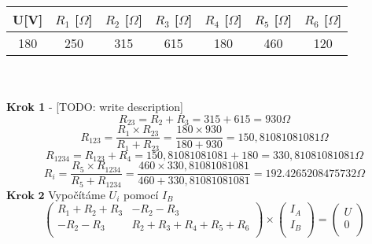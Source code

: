 \documentclass{article}
\begin{document}
\begin{tabular}{| c | c | c | c | c | c | c |}
  \hline
   U[V] & $R_{1}$ [$\Omega$] & $R_{2}$ [$\Omega$]& $R_{3}$ [$\Omega$]& $R_{4}$ [$\Omega$]& $R_{5}$ [$\Omega$]& $R_{6}$ [$\Omega$]\\
  \hline
  180 & 250 & 315 & 615 & 180 & 460 & 120\\
  \hline
\end{tabular}\\
\\
\textbf{Krok 1} - [TODO: write description]\\
\[
  R_{23} = R_{2} + R_{3} = 315 + 615 = 930 \Omega
\]
\[
  R_{123} = \displaystyle\frac{R_{1} \times R_{23}}{R_{1} + R_{23}}=\displaystyle\frac{180 \times 930}{180 + 930} = 150,81081081081 \Omega 
\]
\[
  R_{1234} = R_{123} + R_{4} = 150,81081081081 + 180 = 330,81081081081 \Omega
\]
\[
  R_{i} = \displaystyle\frac{R_{5} \times R_{1234}}{R_{5} + R_{1234}} = \displaystyle\frac{460 \times 330,81081081081}{460 + 330,81081081081} = 192.4265208475732 \Omega
\]
$\textbf{Krok 2}$ Vypočítáme $U_{i}$ pomocí $I_{B}$\\
\[
  \begin{pmatrix}
    R_{1}+R_{2}+R_{3} & -R_{2}-R_{3}\\
    -R_{2}-R_{3} & R_{2}+R_{3}+R_{4}+R_{5}+R_{6}\\
  \end{pmatrix}
  \times
  \begin{pmatrix}
    I_{A}\\
    I_{B}\\
  \end{pmatrix}
  =
  \begin{pmatrix}
    U\\
    0\\
  \end{pmatrix}
\]
\end{document}
